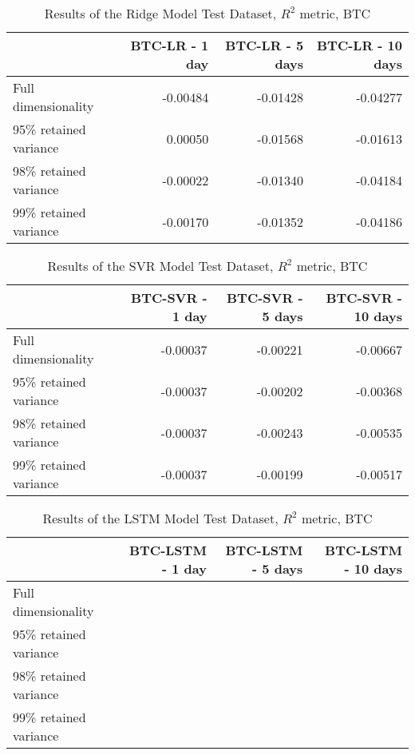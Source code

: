 \begin{table}[htbp]
    \centering
    \caption{Results of the Ridge Model Test Dataset, $R^2$ metric, BTC}
\begin{tabular}{lrrr}
    \toprule
    {} &  BTC-LR - 1 day &  BTC-LR - 5 days &  BTC-LR - 10 days\\
    \midrule
    Full dimensionality   &        -0.00484 &         -0.01428 &          -0.04277 \\
    95\% retained variance &         0.00050 &         -0.01568 &          -0.01613\\
    98\% retained variance &        -0.00022 &         -0.01340 &          -0.04184\\
    99\% retained variance &        -0.00170 &         -0.01352 &          -0.04186\\
    \bottomrule
    \end{tabular}
\end{table}

\begin{table}[htbp]
    \centering
    \caption{Results of the SVR Model Test Dataset, $R^2$ metric, BTC}
\begin{tabular}{lrrr}
    \toprule
    {} &  BTC-SVR - 1 day &  BTC-SVR - 5 days &  BTC-SVR - 10 days\\
    \midrule
    Full dimensionality     &  -0.00037 &          -0.00221 &           -0.00667 \\
    95\% retained variance   &  -0.00037 &          -0.00202 &           -0.00368\\
    98\% retained variance   &  -0.00037 &          -0.00243 &           -0.00535\\
    99\% retained variance   &  -0.00037 &          -0.00199 &           -0.00517\\
    \bottomrule
\end{tabular}
\end{table}

\begin{table}[htbp]
    \centering
    \caption{Results of the LSTM Model Test Dataset, $R^2$ metric, BTC}
\begin{tabular}{lrrr}
    \toprule
    {} &  BTC-LSTM - 1 day &  BTC-LSTM - 5 days &  BTC-LSTM - 10 days \\
    \midrule
    Full dimensionality   &       &           &           \\
    95\% retained variance &       &           &            \\
    98\% retained variance &       &          &            \\
    99\% retained variance &      &       &           \\
    \bottomrule
\end{tabular}
\end{table}

